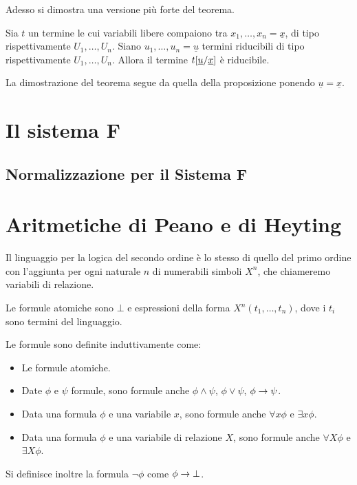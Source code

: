 \documentclass[]{marticle}
\begin{document}
Adesso si dimostra una versione pi\`u forte del teorema.

\begin{block}[Proposizione]
    Sia $t$ un termine le cui variabili libere compaiono tra $x_1, \dots, x_n =
    \underline{x}$, di tipo rispettivamente $U_1, \dots, U_n$. Siano $u_1,
    \dots, u_n = \underline{u}$ termini riducibili di tipo rispettivamente $U_1,
    \dots, U_n$. Allora il termine $t[\underline{u}/\underline{x}]$ \`e
    riducibile.
\end{block}

La dimostrazione del teorema segue da quella della proposizione ponendo
$\underline{u} = \underline{x}$.

\section{Il sistema F}

\subsection{Normalizzazione per il Sistema F}

\section{Aritmetiche di Peano e di Heyting}

\begin{block}[Definizione]
    Il linguaggio per la logica del secondo ordine \`e lo stesso di quello del
    primo ordine con l'aggiunta per ogni naturale $n$ di numerabili simboli
    $X^n$, che chiameremo variabili di relazione. 
    
    Le formule atomiche sono $\bot$ e espressioni della forma $X^n(t_1, \dots,
    t_n)$, dove i $t_i$ sono termini del linguaggio.

    Le formule sono definite induttivamente come:
    \begin{itemize}
        \item Le formule atomiche.
        \item Date $\phi$ e $\psi$ formule, sono formule anche $\phi \land
            \psi$, $\phi \lor \psi$, $\phi \rightarrow \psi$.
        \item Data una formula $\phi$ e una variabile $x$, sono formule anche
            $\forall x \phi$ e $\exists x \phi$.
        \item Data una formula $\phi$ e una variabile di relazione $X$, sono
            formule anche $\forall X \phi$ e $\exists X \phi$.
    \end{itemize}
    Si definisce inoltre la formula $\lnot \phi$ come $\phi \rightarrow \bot$.
\end{block} 
\end{document}
